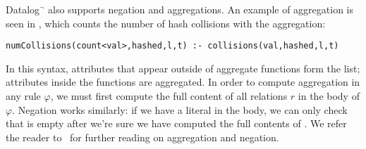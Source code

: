 Datalog$^\neg$ also supports negation and aggregations. An example of aggregation is seen in  , which counts the number of hash collisions with the  aggregation: 
\begin{lstlisting}[language=Dedalus, float=false, firstnumber=4]
numCollisions(count<val>,hashed,l,t) :- collisions(val,hashed,l,t)
\end{lstlisting}
In this syntax, attributes that appear outside of aggregate functions form the  list; attributes inside the functions are aggregated.
In order to compute aggregation in any rule $\varphi$, we must first compute the full content of all relations $r$ in the body of $\varphi$.
Negation works similarly: if we have a literal  in the body, we can only check that  is empty after
we're sure we have computed the full contents of . 
We refer the reader to~\cite{aggAndNeg,alice} for further reading on aggregation and negation.


